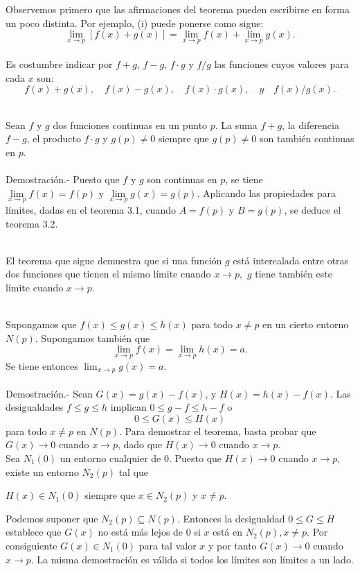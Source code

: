Observemos primero que las afirmaciones del teorema pueden escribirse en forma un poco distinta. Por ejemplo, (i) puede ponerse como sigue:
$$\lim_{x\to p}[f(x)+g(x)]=\lim_{x\to p}f(x) + \lim_{x\to p}g(x).$$\\
Es costumbre indicar por $f+g$, $f-g$, $f\cdot g$ y $f/g$ las funciones cuyos valores para cada $x$ son:
$$f(x)+g(x),\quad f(x)-g(x),\quad f(x)\cdot g(x),\quad y \quad f(x)/g(x).$$\\

\begin{teo}
    Sean $f$ y $g$ dos funciones continuas en un punto $p$. La suma $f+g$, la diferencia $f-g$,  el producto $f\cdot g$ y  $g(p)\neq 0$ siempre que $g(p)\neq 0$ son también continuas en $p$.\\\\
    Demostración.-\; Puesto que $f$ y $g$ son continuas en $p$, se tiene $\lim\limits_{x\to p} f(x)=f(p)$ y $\lim\limits_{x\to p}g(x)=g(p)$. Aplicando las propiedades para límites, dadas en el teorema 3.1, cuando $A=f(p)$ y $B=g(p)$, se deduce el teorema 3.2.\\\\
\end{teo}

El teorema que sigue demuestra que si una función $g$ está intercalada entre otras dos funciones que tienen el mismo límite cuando $x\to p,$ $g$ tiene también este límite cuando $x\to p.$\\\\

\begin{teo}
    Supongamos que $f(x)\leq g(x)\leq h(x)$ para todo $x\neq p$ en un cierto entorno $N(p)$. Supongamos también que 
    $$\lim_{x\to p}f(x)=\lim_{x\to p}h(x)=a.$$
    Se tiene entonces $\lim_{x\to p}g(x)=a.$\\\\
	Demostración.-\; Sean $G(x)=g(x)-f(x)$, y $H(x)=h(x)-f(x)$. Las desigualdades $f\leq g\leq h$ implican $0\leq g-f\leq h-f$ o
	$$0\leq G(x)\leq H(x)$$
	para todo $x\neq p$ en $N(p)$. Para demostrar el teorema, basta probar que $G(x)\to 0$ cuando $x\to p$, dado que $H(x)\to 0$ cuando $x\to p$.\\
	Sea $N_1(0)$ un entorno cualquier de $0$. Puesto que $H(x)\to 0$ cuando $x\to p,$ existe un entorno $N_2(p)$ tal que 
	\begin{center}
	    $H(x) \in N_1(0)$ siempre que $x\in N_2(p)$ y $x\neq p.$
	\end{center}
	    Podemos suponer que $N_2(p) \subseteq N(p)$. Entonces la desigualdad $0\leq G \leq H$ establece que $G(x)$ no está más lejos de $0$ si $x$ está en $N_2(p), x\neq p$. Por consiguiente $G(x)\in N_1(0)$ para tal valor $x$ y por tanto $G(x)\to 0$ cuando $x\to p$. La misma demostración es válida si todos los límites son límites a un lado.\\\\
\end{teo}

